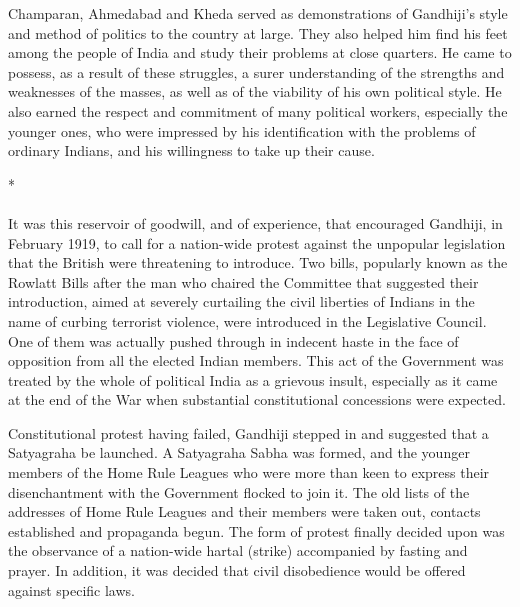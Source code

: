 Champaran, Ahmedabad and Kheda served as demonstrations of Gandhiji's style and method of politics to the country at large. They also helped him find his feet among the people of India and study their problems at close quarters. He came to possess, as a result of these struggles, a surer understanding of the strengths and weaknesses of the masses, as well as of the viability of his own political style. He also earned the respect and commitment of many political workers, especially the younger ones, who were impressed by his identification with the problems of ordinary Indians, and his willingness to take up their cause.

\begin{center}*\end{center}

\paragraph*{}


It was this reservoir of goodwill, and of experience, that encouraged Gandhiji, in February 1919, to call for a nation-wide protest against the unpopular legislation that the British were threatening to introduce. Two bills, popularly known as the Rowlatt Bills after the man who chaired the Committee that suggested their introduction, aimed at severely curtailing the civil liberties of Indians in the name of curbing terrorist violence, were introduced in the Legislative Council. One of them was actually pushed through in indecent haste in the face of opposition from all the elected Indian members. This act of the Government was treated by the whole of political India as a grievous insult, especially as it came at the end of the War when substantial constitutional concessions were expected.

Constitutional protest having failed, Gandhiji stepped in and suggested that a Satyagraha be launched. A Satyagraha Sabha was formed, and the younger members of the Home Rule Leagues who were more than keen to express their disenchantment with the Government flocked to join it. The old lists of the addresses of Home Rule Leagues and their members were taken out, contacts established and propaganda begun. The form of protest finally decided upon was the observance of a nation-wide hartal (strike) accompanied by fasting and prayer. In addition, it was decided that civil disobedience would be offered against specific laws.


